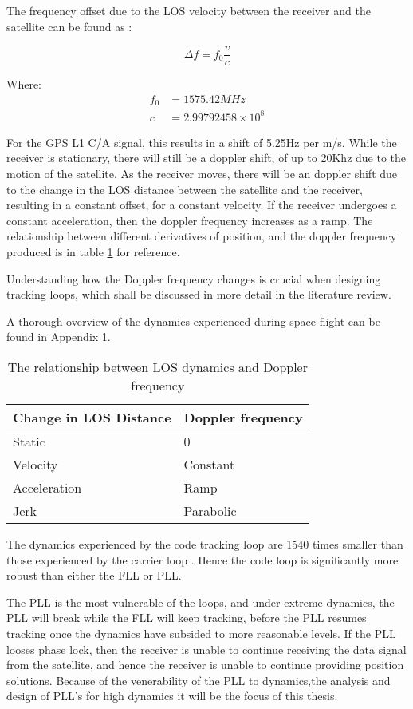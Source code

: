 The frequency offset due to the \ac{LOS} velocity between the receiver and the satellite can be found as : 

\begin{equation}
\Delta f = f_0\frac{v}{c}
\end{equation}

Where: 
\begin{align*}
f_0 &= 1575.42 MHz\\   
c &= 2.99792458 \times 10^8
\end{align*}

For the GPS L1 C/A signal, this results in a shift of 5.25Hz per m/s. 
While the receiver is stationary, there will still be a doppler shift, of up to 20Khz due to the motion of the satellite\cite{Kaplan}. As the receiver moves, there will be an doppler shift due to the change in the \ac{LOS} distance between the satellite and the receiver, resulting in a constant offset, for a constant velocity. If the receiver undergoes a constant acceleration, then the doppler frequency increases as a ramp. The relationship between different derivatives of position, and the doppler frequency produced is in table \ref{table:DopplerDynamics} for reference.

Understanding how the Doppler frequency changes is crucial when designing tracking loops, which shall be discussed in more detail in the literature review. 

A thorough overview of the dynamics experienced during space flight can be found in Appendix 1.

\begin{table}[!htb]
\centering
\begin{tabular}{|l|l|}
\hline
\rowcolor[HTML]{C0C0C0} 
Change in LOS Distance & Doppler frequency \\ \hline
Static                 & 0                 \\ \hline
\rowcolor[HTML]{EFEFEF} 
Velocity               & Constant          \\ \hline
Acceleration           & Ramp              \\ \hline
\rowcolor[HTML]{EFEFEF} 
Jerk                   & Parabolic         \\ \hline
\end{tabular}
\caption{The relationship between \ac{LOS} dynamics and Doppler frequency}
\label{table:DopplerDynamics}
\end{table}


The dynamics experienced by the code tracking loop are 1540 times smaller than those experienced by the carrier loop \cite{Kaplan}. Hence the  code loop is significantly more robust than either the \ac{FLL} or \ac{PLL}.

The \ac{PLL} is the most vulnerable of the loops, and under extreme dynamics, the \ac{PLL} will break while the \ac{FLL} will keep tracking, before the \ac{PLL} resumes tracking once the dynamics have subsided to more reasonable levels. If the \ac{PLL} looses phase lock, then the receiver is unable to continue receiving the data signal from the satellite, and hence the receiver is unable to continue providing position solutions. Because of the venerability of the \ac{PLL} to dynamics,the analysis and design of \ac{PLL}'s for high dynamics it will be the focus of this thesis. 
